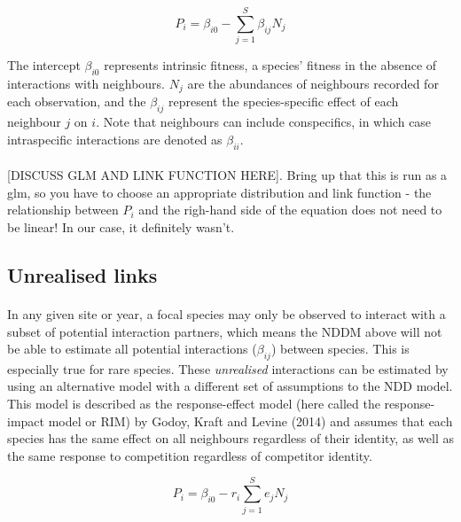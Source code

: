 \documentclass[a4,12pt]{article}
\begin{document}
\begin{itemize}
        \begin{equation}
        P_{i} = \beta_{i0} - \sum_{j=1}^{S} \beta_{ij} N_{j}
        \label{nddm}
        \end{equation}
        
        The intercept $\beta_{i0}$ represents intrinsic fitness, a species' fitness in the absence of interactions with neighbours. $N_{j}$ are the abundances of neighbours recorded for each observation, and the $\beta_{ij}$ represent the species-specific effect of each neighbour $j$ on $i$. Note that neighbours can include conspecifics, in which case intraspecific interactions are denoted as $\beta_{ii}$.

        \paragraph{}
        [DISCUSS GLM AND LINK FUNCTION HERE]. Bring up that this is run as a glm, so you have to choose an appropriate distribution and link function - the relationship between $P_i$ and the righ-hand side of the equation does not need to be linear! In our case, it definitely wasn't.
              
    \subsection{Unrealised links}
    
        \paragraph{}
        In any given site or year, a focal species may only be observed to interact with a subset of potential interaction partners, which means the NDDM above will not be able to estimate all potential interactions ($\beta_{ij}$) between species. This is especially true for rare species. These \textit{unrealised} interactions can be estimated by using an alternative model with a different set of assumptions to the NDD model. This model is described as the response-effect model (here called the response-impact model or RIM) by Godoy, Kraft and Levine (2014) and assumes that each species has the same effect on all neighbours regardless of their identity, as well as the same response to competition regardless of competitor identity. 
        
        \begin{equation}
        P_{i} = \beta_{i0} - r_{i} \sum_{j=1}^{S} e_{j} N_{j}
        \label{rim}
        \end{equation}
        

\end{itemize}
\end{document}
